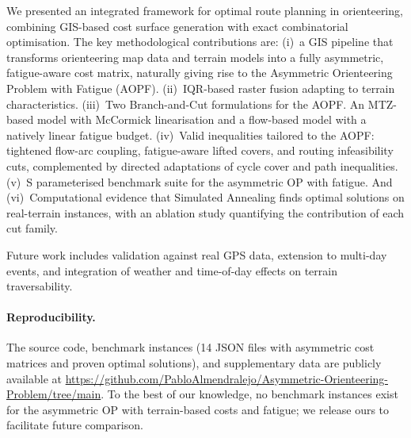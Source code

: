 \documentclass[11pt,a4paper]{article}
\begin{document}
We presented an integrated framework for optimal route planning in orienteering, combining GIS-based cost surface generation with exact combinatorial optimisation.
The key methodological contributions are:
(i)~a GIS pipeline that transforms orienteering map data and terrain models into a fully asymmetric, fatigue-aware cost matrix, naturally giving rise to the Asymmetric Orienteering Problem with Fatigue (AOPF).
(ii)~IQR-based raster fusion adapting to terrain characteristics.
(iii)~Two Branch-and-Cut formulations for the AOPF. An MTZ-based model with McCormick linearisation and a flow-based model with a natively linear fatigue budget.
(iv)~Valid inequalities tailored to the AOPF: tightened flow-arc coupling, fatigue-aware lifted covers, and routing infeasibility cuts, complemented by directed adaptations of cycle cover and path inequalities.
(v)~S parameterised benchmark suite for the asymmetric OP with fatigue. And
(vi)~Computational evidence that Simulated Annealing finds optimal solutions on real-terrain instances, with an ablation study quantifying the contribution of each cut family.

Future work includes validation against real GPS data, extension to multi-day events, and integration of weather and time-of-day effects on terrain traversability.

\paragraph{Reproducibility.}
The source code, benchmark instances (14 JSON files with asymmetric cost matrices and proven optimal solutions), and supplementary data are publicly available at \url{https://github.com/PabloAlmendralejo/Asymmetric-Orienteering-Problem/tree/main}.
To the best of our knowledge, no benchmark instances exist for the asymmetric OP with terrain-based costs and fatigue; we release ours to facilitate future comparison.



\end{document}
